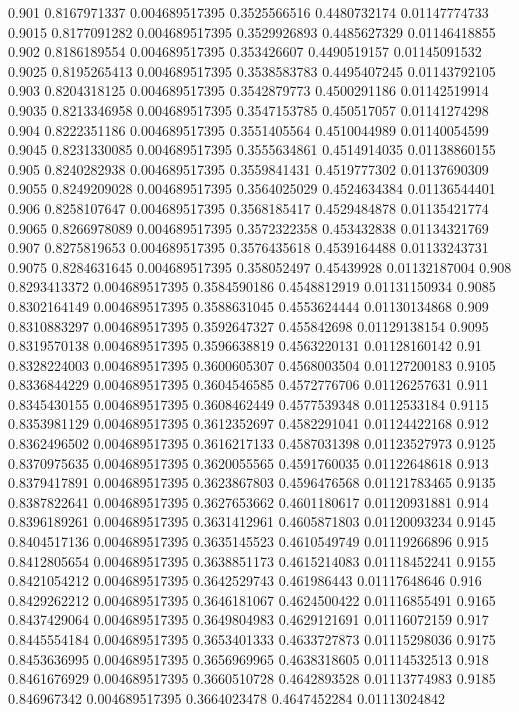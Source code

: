 {0.901 0.8167971337 0.004689517395 0.3525566516 0.4480732174 0.01147774733
0.9015 0.8177091282 0.004689517395 0.3529926893 0.4485627329 0.01146418855
0.902 0.8186189554 0.004689517395 0.353426607 0.4490519157 0.01145091532
0.9025 0.8195265413 0.004689517395 0.3538583783 0.4495407245 0.01143792105
0.903 0.8204318125 0.004689517395 0.3542879773 0.4500291186 0.01142519914
0.9035 0.8213346958 0.004689517395 0.3547153785 0.450517057 0.01141274298
0.904 0.8222351186 0.004689517395 0.3551405564 0.4510044989 0.01140054599
0.9045 0.8231330085 0.004689517395 0.3555634861 0.4514914035 0.01138860155
0.905 0.8240282938 0.004689517395 0.3559841431 0.4519777302 0.01137690309
0.9055 0.8249209028 0.004689517395 0.3564025029 0.4524634384 0.01136544401
0.906 0.8258107647 0.004689517395 0.3568185417 0.4529484878 0.01135421774
0.9065 0.8266978089 0.004689517395 0.3572322358 0.453432838 0.01134321769
0.907 0.8275819653 0.004689517395 0.3576435618 0.4539164488 0.01133243731
0.9075 0.8284631645 0.004689517395 0.358052497 0.45439928 0.01132187004
0.908 0.8293413372 0.004689517395 0.3584590186 0.4548812919 0.01131150934
0.9085 0.8302164149 0.004689517395 0.3588631045 0.4553624444 0.01130134868
0.909 0.8310883297 0.004689517395 0.3592647327 0.455842698 0.01129138154
0.9095 0.8319570138 0.004689517395 0.3596638819 0.4563220131 0.01128160142
0.91 0.8328224003 0.004689517395 0.3600605307 0.4568003504 0.01127200183
0.9105 0.8336844229 0.004689517395 0.3604546585 0.4572776706 0.01126257631
0.911 0.8345430155 0.004689517395 0.3608462449 0.4577539348 0.0112533184
0.9115 0.8353981129 0.004689517395 0.3612352697 0.4582291041 0.01124422168
0.912 0.8362496502 0.004689517395 0.3616217133 0.4587031398 0.01123527973
0.9125 0.8370975635 0.004689517395 0.3620055565 0.4591760035 0.01122648618
0.913 0.8379417891 0.004689517395 0.3623867803 0.4596476568 0.01121783465
0.9135 0.8387822641 0.004689517395 0.3627653662 0.4601180617 0.01120931881
0.914 0.8396189261 0.004689517395 0.3631412961 0.4605871803 0.01120093234
0.9145 0.8404517136 0.004689517395 0.3635145523 0.4610549749 0.01119266896
0.915 0.8412805654 0.004689517395 0.3638851173 0.4615214083 0.01118452241
0.9155 0.8421054212 0.004689517395 0.3642529743 0.461986443 0.01117648646
0.916 0.8429262212 0.004689517395 0.3646181067 0.4624500422 0.01116855491
0.9165 0.8437429064 0.004689517395 0.3649804983 0.4629121691 0.01116072159
0.917 0.8445554184 0.004689517395 0.3653401333 0.4633727873 0.01115298036
0.9175 0.8453636995 0.004689517395 0.3656969965 0.4638318605 0.01114532513
0.918 0.8461676929 0.004689517395 0.3660510728 0.4642893528 0.01113774983
0.9185 0.846967342 0.004689517395 0.3664023478 0.4647452284 0.01113024842
}
